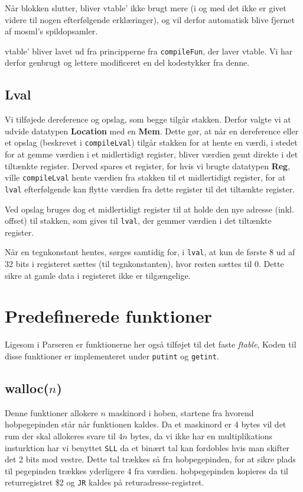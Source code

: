 \documentclass[a4paper, 10pt]{article}
\begin{document}
Når blokken slutter, bliver vtable' ikke brugt mere (i og med det ikke er givet
videre til nogen efterfølgende erklæringer), og vil derfor automatisk blive
fjernet af mosml's spildopsamler.

vtable' bliver lavet ud fra principperne fra \texttt{compileFun}, der laver 
vtable. Vi har derfor genbrugt og lettere modificeret en del kodestykker fra 
denne.

\subsection{Lval}
Vi tilføjede dereference og opslag, som begge tilgår stakken. Derfor valgte vi
at udvide datatypen \textbf{Location} med en \textbf{Mem}. Dette gør, at når en
dereference eller et opslag (beskrevet i \texttt{compileLval}) tilgår stakken 
for at hente en værdi, i stedet for at gemme værdien i et midlertidigt
register, bliver værdien gemt direkte i det tiltænkte register. Derved spares et
register, for hvis vi brugte datatypen \textbf{Reg}, ville \texttt{compileLval}
hente værdien fra stakken til et midlertidigt register, for at \texttt{lval}
efterfølgende kan flytte værdien fra dette register til det tiltænkte register.

Ved opslag bruges dog et midlertidigt register til at holde den nye adresse
(inkl. offset) til stakken, som gives til \texttt{lval}, der gemmer værdien i
det tiltænkte register.

Når en tegnkonstant hentes, sørges samtidig for, i \texttt{lval}, at kun de
første 8 ud af 32 bits i registeret sættes (til tegnkonstanten), hvor resten
sættes til 0. Dette sikre at gamle data i registeret ikke er tilgængelige.


\section{Predefinerede funktioner}
Ligesom i Parseren er funktionerne her også tilføjet til det faste \textit{ftable},
Koden til disse funktioner er implementeret under \texttt{putint} og \texttt{getint}.

\subsection{walloc($n$)}
Denne funktioner allokere $n$ maskinord i hoben, startene fra hvorend hobpegepinden står når funktionen kaldes. Da et maskinord er 4 bytes vil det rum der skal allokeres svare til $4\dot n$ bytes, da vi ikke har en multiplikations insturktion har vi benyttet \texttt{SLL} da et binært tal kan fordobles hvis man skifter det 2 bits mod vestre. Dette tal trækkes så fra hobpegepinden, for at sikre plads til pegepinden trækkes yderligere 4 fra værdien. hobpegepinden kopieres da til returregistret \$2 og \texttt{JR} kaldes på returadresse-registret.
\end{document}
